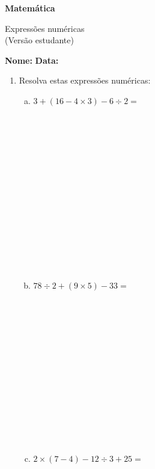 \documentclass[a4paper,14pt]{article}
\begin{document}
	
	\noindent\textbf{Matemática} 
	
	\begin{center}Expressões numéricas \\ (Versão estudante)
	\end{center}
	
	\noindent\textbf{Nome:} \underline{\hspace{10cm}}
	\noindent\textbf{Data:} \underline{\hspace{4cm}}
	
	
	
    \begin{multicols}{2}
		\begin{enumerate}
			\item Resolva estas expressões numéricas:
			\begin{enumerate}[a)]
				\item $3 + (16 - 4 \times 3) - 6 \div 2 = $ \\\\\\\\\\\\\\\\\\\\\\\\\\\\\\
				\item $78 \div 2 + (9 \times 5) - 33 = $ \\\\\\\\\\\\\\\\\\\\\\\\\\\\
				\item $2 \times (7 - 4) - 12 \div 3 + 25 = $
				 \\\\\\\\\\\\\\\\\\\\\\\\\\\\

\end{enumerate}
\end{enumerate}
\end{multicols}
\end{document}
